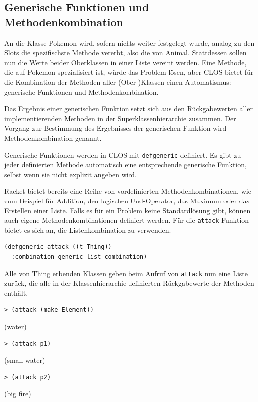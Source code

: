 \subsection{Generische Funktionen und Methodenkombination}
An die Klasse Pokemon wird, sofern nichts weiter festgelegt wurde, analog zu den Slots die spezifischste Methode vererbt, also die von Animal. Stattdessen sollen nun die Werte beider Oberklassen in einer Liste vereint werden. Eine Methode, die auf Pokemon spezialisiert ist, würde das Problem lösen, aber CLOS bietet für die Kombination der Methoden aller (Ober-)Klassen einen Automatismus: generische Funktionen und Methodenkombination. 
 
Das Ergebnis einer generischen Funktion setzt sich aus den Rückgabewerten aller implementierenden Methoden in der Superklassenhierarchie zusammen. Der Vorgang zur Bestimmung des Ergebnisses der generischen Funktion wird Methodenkombination genannt.

Generische Funktionen werden in CLOS mit \texttt{defgeneric} definiert. Es gibt zu jeder definierten Methode automatisch eine entsprechende generische Funktion, selbst wenn sie nicht explizit angeben wird. 

Racket bietet bereits eine Reihe von vordefinierten Methodenkombinationen, wie zum Beispiel für Addition, den logischen Und-Operator, das Maximum oder das Erstellen einer Liste. Falls es für ein Problem keine Standardlösung gibt, können auch eigene Methodenkombinationen definiert werden. Für die \texttt{attack}-Funktion bietet es sich an, die Listenkombination zu verwenden.

\begin{lstlisting}
(defgeneric attack ((t Thing))
  :combination generic-list-combination)
\end{lstlisting}

Alle von Thing erbenden Klassen geben beim Aufruf von \texttt{attack} nun eine Liste zurück, die alle in der Klassenhierarchie definierten Rückgabewerte der Methoden enthält.

\begin{lstlisting}
> (attack (make Element))
\end{lstlisting}
{\rsymbol (water)}

\begin{lstlisting}
> (attack p1)
\end{lstlisting}
{\rsymbol (small water)}

\begin{lstlisting}
> (attack p2)
\end{lstlisting}
{\rsymbol (big fire)}

